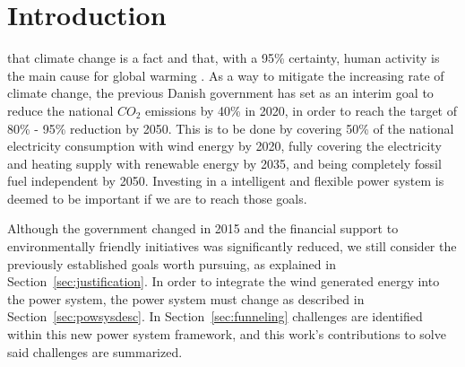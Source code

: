 \chapter{Introduction}
 that climate change is a fact and that, with a 95\% certainty, human activity is the main cause for global warming . As a way to mitigate the increasing rate of climate change, the previous Danish government  has set as an interim goal to reduce the national $CO_2$ emissions by 40\% in 2020, in order to reach the target of 80\% - 95\% reduction by 2050. This is to be done by covering 50\% of the national electricity consumption with wind energy by 2020, fully covering the electricity and heating supply with renewable energy by 2035, and being completely fossil fuel independent by 2050. Investing in a intelligent and flexible power system is deemed to be important if we are to reach those goals.

Although the government  changed in 2015 and the financial support to environmentally friendly initiatives was significantly reduced, we still consider the previously established goals worth pursuing, as explained in Section~\ref{sec:justification}. In order to integrate the wind generated energy into the power system, the power system must change as described in Section~\ref{sec:powsysdesc}. In Section~\ref{sec:funneling} challenges are identified within this new power system framework, and this work's contributions to solve said challenges are summarized.
\clearpage
